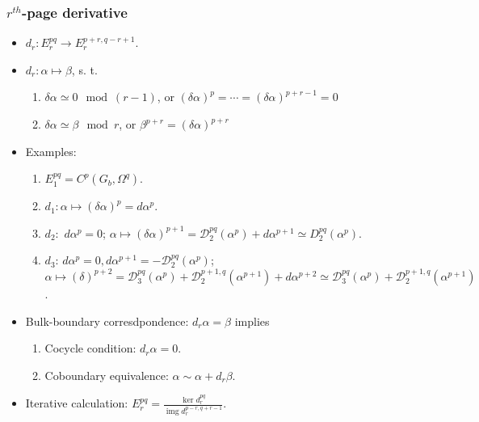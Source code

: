 \documentclass[xcolor=table, aspectratio=169]{beamer}
\DeclareMathOperator{\img}{img}
\begin{document}
\begin{frame}
	\frametitle{$r^{th}$-page derivative}
	\begin{itemize}
		\item $d_r: E^{pq}_r\rightarrow E^{p+r,q-r+1}_r$.
		\item $d_r: \alpha\mapsto\beta$, s. t.
		\begin{enumerate}
			\item $\delta\alpha\simeq0 \mod (r-1)$, or $(\delta\alpha)^p=\cdots=(\delta\alpha)^{p+r-1}=0$
			\item $\delta\alpha\simeq\beta\mod r$, or $\beta^{p+r}=(\delta\alpha)^{p+r}$
		\end{enumerate}
		\item Examples:
		\begin{enumerate}
			\item $E^{pq}_1=C^p(G_b, \Omega^q)$.
			\item $d_1: \alpha\mapsto(\delta\alpha)^p=d\alpha^p$.
			\item $d_2:$ $d\alpha^p=0$; $\alpha\mapsto(\delta\alpha)^{p+1}=\mathcal D_2^{pq}(\alpha^p)+d\alpha^{p+1}\simeq D_2^{pq}(\alpha^p)$.
			\item $d_3$: $d\alpha^p=0,d\alpha^{p+1}=-\mathcal D_2^{pq}(\alpha^p)$;
			$\alpha\mapsto(\delta)^{p+2}
			=\mathcal D^{pq}_3(\alpha^p)
			 + \mathcal D^{p+1,q}_2(\alpha^{p+1}) + d\alpha^{p+2}
			\simeq\mathcal D^{pq}_3(\alpha^p)
			 + \mathcal D^{p+1,q}_2(\alpha^{p+1})$.
		\end{enumerate}
		\item Bulk-boundary corresdpondence: $d_r\alpha = \beta$ implies
		\begin{enumerate}
			\item Cocycle condition: $d_r\alpha=0$.
			\item Coboundary equivalence: $\alpha\sim\alpha+d_r\beta$.
		\end{enumerate}
		\item Iterative calculation:
		$E^{pq}_r=\frac{\ker d_r^{pq}}{\img d_r^{p-r,q+r-1}}$.
	\end{itemize}
\end{frame}
\end{document}

